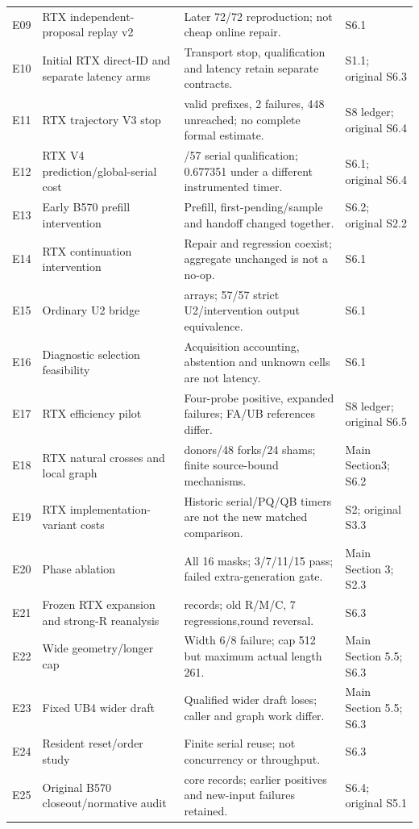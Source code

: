 \begin{table}[tp]
\begin{tabular}{@{}>{\raggedright\arraybackslash}p{}>{\raggedright\arraybackslash}p{}>{\raggedright\arraybackslash}p{}>{\raggedright\arraybackslash}p{}@{}}
E09 & RTX independent-proposal replay v2 & Later 72/72 reproduction; not cheap online repair. & S6.1\\
E10 & Initial RTX direct-ID and separate latency arms & Transport stop, qualification and latency retain separate contracts. & S1.1; original S6.3\\
E11 & RTX trajectory V3 stop & 126 valid prefixes, 2 failures, 448 unreached; no complete formal estimate. & S8 ledger; original S6.4\\
E12 & RTX V4 prediction/global-serial cost & 57/57 serial qualification; 0.677351 under a different instrumented timer. & S6.1; original S6.4\\
E13 & Early B570 prefill intervention & Prefill, first-pending/sample and handoff changed together. & S6.2; original S2.2\\
E14 & RTX continuation intervention & Repair and regression coexist; aggregate unchanged is not a no-op. & S6.1\\
E15 & Ordinary U2 bridge & 171 arrays; 57/57 strict U2/intervention output equivalence. & S6.1\\
E16 & Diagnostic selection feasibility & Acquisition accounting, abstention and unknown cells are not latency. & S6.1\\
E17 & RTX efficiency pilot & Four-probe positive, expanded failures; FA/UB references differ. & S8 ledger; original S6.5\\
E18 & RTX natural crosses and local graph & 24 donors/48 forks/24 shams; finite source-bound mechanisms. & Main Section3; S6.2\\
E19 & RTX implementation-variant costs & Historic serial/PQ/QB timers are not the new matched comparison. & S2; original S3.3\\
E20 & Phase ablation & All 16 masks; 3/7/11/15 pass; failed extra-generation gate. & Main Section 3; S2.3\\
E21 & Frozen RTX expansion and strong-R reanalysis & 384 records; old R/M/C, 7 regressions,round reversal. & S6.3\\
E22 & Wide geometry/longer cap & Width 6/8 failure; cap 512 but maximum actual length 261. & Main Section 5.5; S6.3\\
E23 & Fixed UB4 wider draft & Qualified wider draft loses; caller and graph work differ. & Main Section 5.5; S6.3\\
E24 & Resident reset/order study & Finite serial reuse; not concurrency or throughput. & S6.3\\
E25 & Original B570 closeout/normative audit & 1456 core records; earlier positives and new-input failures retained. & S6.4; original S5.1\\

\end{tabular}
\end{table}

